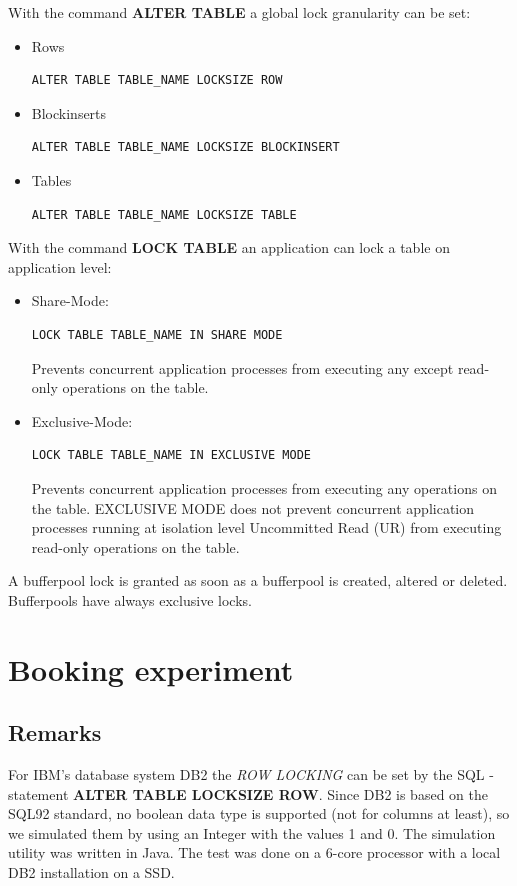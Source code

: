 \documentclass{vldb}
\begin{document}
With the command \textbf{ALTER TABLE} a global lock granularity can be set:
\begin{itemize}
\item Rows
\begin{verbatim}
ALTER TABLE TABLE_NAME LOCKSIZE ROW
\end{verbatim}
\item Blockinserts
\begin{verbatim}
ALTER TABLE TABLE_NAME LOCKSIZE BLOCKINSERT
\end{verbatim}
\item Tables
\begin{verbatim}
ALTER TABLE TABLE_NAME LOCKSIZE TABLE
\end{verbatim}
\end{itemize}

With the command \textbf{LOCK TABLE} an application can lock a table on application level:
\begin{itemize}
\item Share-Mode:
\begin{verbatim}
LOCK TABLE TABLE_NAME IN SHARE MODE
\end{verbatim}
Prevents concurrent application processes from executing any except read-only operations on the table.
\item Exclusive-Mode:
\begin{verbatim}
LOCK TABLE TABLE_NAME IN EXCLUSIVE MODE
\end{verbatim}
Prevents concurrent application processes from executing any operations on the table. EXCLUSIVE MODE does not prevent concurrent application 
processes running at isolation level Uncommitted Read (UR) from executing read-only operations on the table.
\end{itemize}

A bufferpool lock is granted as soon as a bufferpool is created, altered or deleted. Bufferpools have always exclusive locks.

\section{Booking experiment}

\subsection{Remarks} For IBM's database system DB2 the \textit{ROW LOCKING} can be set by the SQL - statement \textbf{ALTER TABLE LOCKSIZE ROW}. Since DB2 is based on the SQL92 standard, no boolean data type is supported (not for columns at least), so we simulated them by using an Integer with the values 1 and 0. The simulation utility was written in Java. The test was done on a 6-core processor with a local DB2 installation on a SSD.
\end{document}

